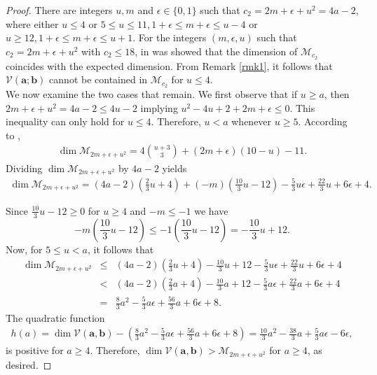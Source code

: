 \documentclass[twoside,reqno]{amsart}
\theoremstyle{plain}
\begin{document}
 \begin{proof}
There are integers $u, m$ and $\epsilon\in\{0,1\}$ such that $c_2=2m+\epsilon+u^2=4a-2$, where either 
$u\leq4$ or $5\leq u\leq11, 1+\epsilon\leq m+\epsilon\leq u-4$ or $u\geq12, 1+\epsilon\leq m+\epsilon\leq u+1$. For the integers $(m, \epsilon,u)$ such that $c_2=2m+\epsilon+u^2$ with $c_2\leq18$, in \cite[Subsection 4.1]{tikhomirov2019} was showed that the dimension of $\mathcal{M}_{c_2}$ coincides with the expected dimension. From Remark \ref{rmk1}, it follows that $\mathcal{V}(\boldsymbol{a};\boldsymbol{b})$ cannot 
be contained in $\mathcal{M}_{c_2}$ for $u\leq4$. \\
We now examine the two cases that remain. We first observe that if $u\geq a$, 
then $2m+\epsilon+u^2=4a-2\leq 4u-2$ implying $u^2-4u+2+2m+\epsilon\leq0$. This inequality can only hold for 
$u\leq4$. Therefore, $u<a$ whenever $u\geq5$. According to \cite[Equation 53]{tikhomirov2019},
\begin{eqnarray*}
\dim \mathcal{M}_{2m+\epsilon+u^2}=4\binom{u+3}{3}+(2m+\epsilon)(10-u)-11.
\end{eqnarray*}
Dividing $\dim \mathcal{M}_{2m+\epsilon+u^2}$ by $4a-2$ yields
\begin{eqnarray*}
\dim \mathcal{M}_{2m+\epsilon+u^2}=(4a-2)(\frac{2}{3}u+4)+(-m)(\frac{10}{3}u-12)-\frac{5}{3}u\epsilon+\frac{22}{3}u+6\epsilon+4.
\end{eqnarray*}

Since $\frac{10}{3}u-12\geq0$ for $u\geq4$ and $-m\leq-1$ we have 
$$-m(\frac{10}{3}u-12)\leq-1(\frac{10}{3}u-12)=-\frac{10}{3}u+12.$$
Now, for $5\leq u<a$, it follows that
\begin{eqnarray*}
\dim \mathcal{M}_{2m+\epsilon+u^2}&\leq&(4a-2)(\frac{2}{3}u+4)-\frac{10}{3}u+12-\frac{5}{3}u\epsilon+\frac{22}{3}u+6\epsilon+4\\
&<&(4a-2)(\frac{2}{3}a+4)-\frac{10}{3}a+12-\frac{5}{3}a\epsilon+\frac{22}{3}a+6\epsilon+4\\
&=& \frac{8}{3}a^2-\frac{5}{3}a\epsilon+\frac{56}{3}a+6\epsilon+8.
\end{eqnarray*}
The quadratic function
\begin{eqnarray*}
h(a)=\dim\mathcal{V}(\boldsymbol{a},\boldsymbol{b})-(\frac{8}{3}a^2-\frac{5}{3}a\epsilon+\frac{56}{3}a+6\epsilon+8)=\frac{10}{3}a^2-\frac{38}{3}a+\frac{5}{3}a\epsilon-6\epsilon,
\end{eqnarray*}
is positive for $a\geq4$. Therefore, $\dim \mathcal{V}(\boldsymbol{a},\boldsymbol{b})>\mathcal{M}_{2m+\epsilon+u^2}$ for $a\geq4$, as desired. 


\end{proof}
\end{document}
